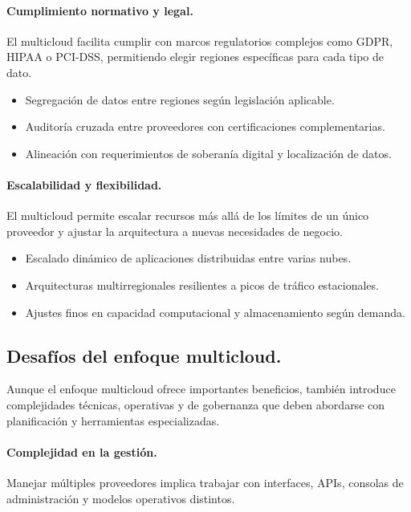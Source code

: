 {            \paragraph{Cumplimiento normativo y legal.}
            El multicloud facilita cumplir con marcos regulatorios complejos como GDPR, HIPAA o PCI-DSS, permitiendo elegir regiones específicas para cada tipo de dato.
            
            \begin{itemize}
                \item Segregación de datos entre regiones según legislación aplicable.
                \item Auditoría cruzada entre proveedores con certificaciones complementarias.
                \item Alineación con requerimientos de soberanía digital y localización de datos.
            \end{itemize}
            
            \paragraph{Escalabilidad y flexibilidad.}
            El multicloud permite escalar recursos más allá de los límites de un único proveedor y ajustar la arquitectura a nuevas necesidades de negocio.
            
            \begin{itemize}
                \item Escalado dinámico de aplicaciones distribuidas entre varias nubes.
                \item Arquitecturas multirregionales resilientes a picos de tráfico estacionales.
                \item Ajustes finos en capacidad computacional y almacenamiento según demanda.
            \end{itemize}
            
        \subsection{Desafíos del enfoque multicloud.}
            Aunque el enfoque multicloud ofrece importantes beneficios, también introduce complejidades técnicas, operativas y de gobernanza que deben abordarse con planificación y herramientas especializadas.
            
            \paragraph{Complejidad en la gestión.}
            Manejar múltiples proveedores implica trabajar con interfaces, APIs, consolas de administración y modelos operativos distintos.
            
}
